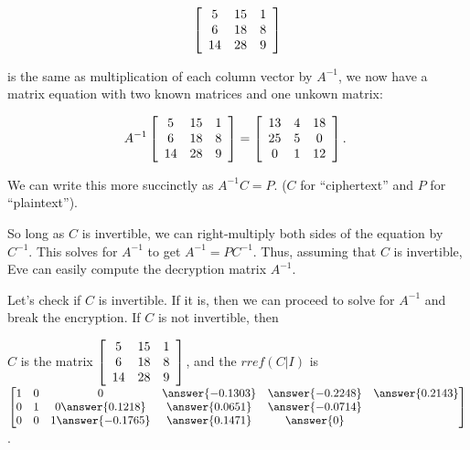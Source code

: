 \documentclass{ximera}
\begin{document}
\begin{example}
  \begin{equation*}
    \startmat{ccc}
      5 & 15 & 1 \\
      6 & 18 & 8 \\
      14 & 28 & 9 \\
    \stopmat
  \end{equation*}

  is the same as multiplication of each column vector by $A^{-1}$, we now have a matrix equation with two known matrices and one unkown matrix:
  
  \begin{equation*}
    A^{-1} \startmat{ccc}
      5 & 15 & 1 \\
      6 & 18 & 8 \\
      14 & 28 & 9 \\
    \stopmat
    = \startmat{ccc}
      13 & 4 & 18 \\
      25 & 5 & 0 \\
      0 & 1 & 12 \\
    \stopmat.\quad
  \end{equation*}

  We can write this more succinctly as $A^{-1}C=P$. ($C$
 for ``ciphertext'' and $P$ for ``plaintext''). 
 
  So long as $C$ is invertible, we can right-multiply 
  both sides of the equation by $C^{-1}$. This solves for $A^{-1}$ to get
  $A^{-1} = PC^{-1}$. Thus, assuming that $C$ is invertible, Eve can
  easily compute the decryption matrix $A^{-1}$. 

  Let's check if $C$ is invertible. If it is, then we can proceed to solve for $A^{-1}$ and break the encryption. If $C$ is not invertible, then 

  $C$ is the matrix $\startmat{ccc}
  5 & 15 & 1 \\
  6 & 18 & 8 \\
  14 & 28 & 9 \\
\stopmat$, and the $rref(C|I)$ is $\begin{bmatrix}
  1&0&0&\answer{-0.1303} & \answer{-0.2248} & \answer{0.2143} \\
  0&1&0\answer{0.1218} & \answer{0.0651} & \answer{-0.0714} \\
  0&0&1\answer{-0.1765} & \answer{0.1471} & \answer{0}
  \end{bmatrix}$.


\end{example}
\end{document}
